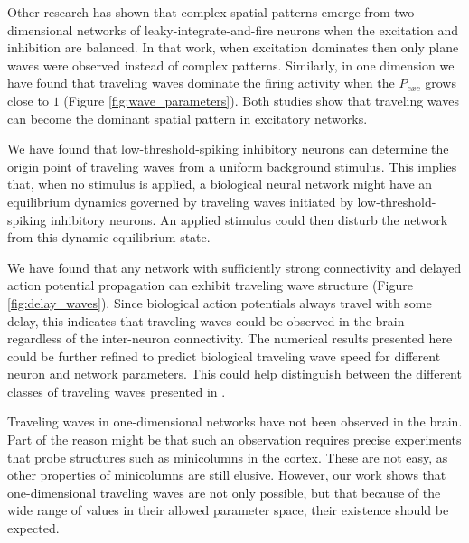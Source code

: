 \documentclass[12pt]{article}
\begin{document}
Other research \parencite{keane2015} has shown that complex spatial patterns emerge from two-dimensional networks of leaky-integrate-and-fire neurons when the excitation and inhibition are balanced.
In that work, when excitation dominates then only plane waves were observed instead of complex patterns.
Similarly, in one dimension we have found that traveling waves dominate the firing activity when the $P_{exc}$ grows close to $1$ (Figure \ref{fig:wave_parameters}).
Both studies show that traveling waves can become the dominant spatial pattern in excitatory networks.

We have found that low-threshold-spiking inhibitory neurons can determine the origin point of traveling waves from a uniform background stimulus.
This implies that, when no stimulus is applied, a biological neural network might have an equilibrium dynamics governed by traveling waves initiated by low-threshold-spiking inhibitory neurons.
An applied stimulus could then disturb the network from this dynamic equilibrium state.

We have found that any network with sufficiently strong connectivity and delayed action potential propagation can exhibit traveling wave structure (Figure \ref{fig:delay_waves}).
Since biological action potentials always travel with some delay, this indicates that traveling waves could be observed in the brain regardless of the inter-neuron connectivity.
The numerical results presented here could be further refined to predict biological traveling wave speed for different neuron and network parameters.
This could help distinguish between the different classes of traveling waves presented in \parencite{ermentrout2001}.

Traveling waves in one-dimensional networks have not been observed in the brain. 
Part of the reason might be that such an observation requires precise experiments that probe structures such as minicolumns in the cortex. 
These are not easy, as other properties of minicolumns are still elusive. 
However, our work shows that one-dimensional traveling waves are not only possible, but that because of the wide range of values in their allowed parameter space, their existence should be expected.


\clearpage
\printbibliography
\end{document}
